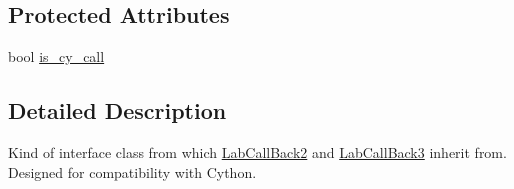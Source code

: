 \subsection*{Protected Attributes}
\begin{DoxyCompactItemize}
\item 
bool \hyperlink{classelps_1_1_a_lab_call_back_a15debd77d822894cfcd63465b0c35c21}{is\+\_\+cy\+\_\+call}
\end{DoxyCompactItemize}


\subsection{Detailed Description}
Kind of interface class from which \hyperlink{classelps_1_1_lab_call_back2}{Lab\+Call\+Back2} and \hyperlink{classelps_1_1_lab_call_back3}{Lab\+Call\+Back3} inherit from. Designed for compatibility with Cython. 

